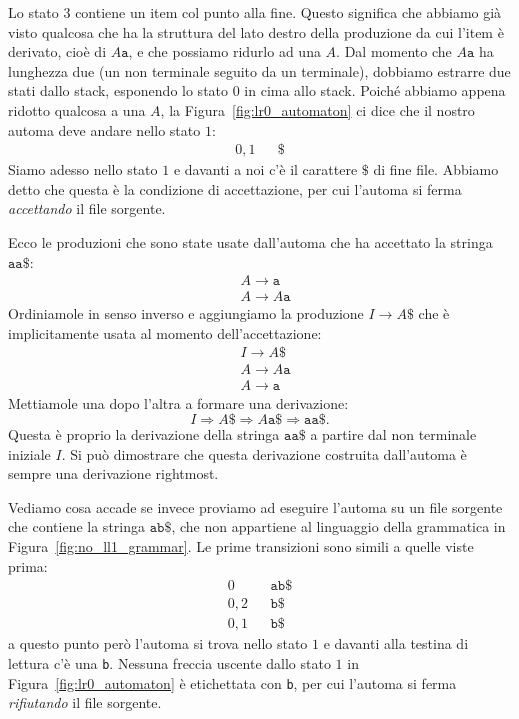 Lo stato $3$ contiene un item col punto alla fine. Questo significa che
abbiamo gi\`a visto qualcosa che ha la struttura del lato destro della
produzione da cui l'item \`e derivato, cio\`e di $A\mathtt{a}$, e che possiamo
ridurlo ad una $A$. Dal momento che $A\mathtt{a}$ ha lunghezza due
(un non terminale seguito da un terminale), dobbiamo estrarre due stati
dallo stack, esponendo lo stato $0$ in cima allo stack.
Poich\'e abbiamo appena ridotto qualcosa a una
$A$, la Figura~\ref{fig:lr0_automaton} ci dice che il nostro automa deve
andare nello stato $1$:
\begin{align*}
  0,1 & & \mathtt{\$}
\end{align*}
Siamo adesso nello stato $1$ e davanti a noi c'\`e il carattere
$\mathtt{\$}$ di fine file. Abbiamo detto che questa \`e la condizione
di accettazione, per cui l'automa si ferma \emph{accettando} il file sorgente.

Ecco le produzioni che sono state usate dall'automa che ha accettato la
stringa $\mathtt{aa\$}$:
\begin{align*}
&A\to\mathtt{a}\\
&A\to A\mathtt{a}
\end{align*}
Ordiniamole in senso inverso e aggiungiamo la produzione $I\to A\mathtt{\$}$
che \`e implicitamente usata al momento dell'accettazione:
\begin{align*}
&I\to A\mathtt{\$}\\
&A\to A\mathtt{a}\\
&A\to\mathtt{a}
\end{align*}
Mettiamole una dopo l'altra a formare una derivazione:
\[
 I\Rightarrow A\mathtt{\$}\Rightarrow A\mathtt{a\$}\Rightarrow
   \mathtt{aa\$}.
\]
Questa \`e proprio la derivazione della stringa $\mathtt{aa\$}$ a partire
dal non terminale iniziale $I$. Si pu\`o dimostrare che questa derivazione
costruita dall'automa \`e sempre una derivazione rightmost.

Vediamo cosa accade se invece proviamo ad eseguire l'automa su un file
sorgente che contiene la stringa $\mathtt{ab\$}$, che non appartiene al
linguaggio della grammatica in Figura~\ref{fig:no_ll1_grammar}. Le prime
transizioni sono simili a quelle viste prima:
%
\begin{align*}
  0 & & \mathtt{ab\$}\\
  0,2 & & \mathtt{b\$}\\
  0,1 & & \mathtt{b\$}
\end{align*}
%
a questo punto per\`o l'automa si trova nello stato $1$ e davanti alla
testina di lettura c'\`e una \texttt{b}. Nessuna freccia uscente dallo
stato $1$ in
Figura~\ref{fig:lr0_automaton} \`e etichettata con \texttt{b}, per cui
l'automa si ferma \emph{rifiutando} il file sorgente.

